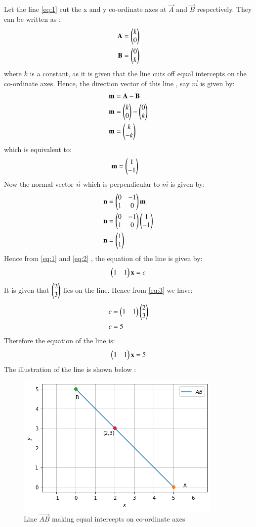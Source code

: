 \documentclass[journal,12pt,twocolumn]{IEEEtran}
\begin{document}
Let the line \eqref{eq:1} cut the x and y co-ordinate axes at $\vec{A}$ and $\vec{B}$ respectively. They can be written as :
\begin{align}
\mathbf{A} &= \begin{pmatrix}k \\ 0\end{pmatrix}\\
\mathbf{B} &= \begin{pmatrix}0 \\ k\end{pmatrix}
\end{align}
where $k$ is a constant, as it is given that the line cuts off equal intercepts on the co-ordinate axes. Hence, the direction vector of this line , say $\vec{m}$ is given by:
\begin{align}
\mathbf{m} &= \mathbf{A} - \mathbf{B}\\
\mathbf{m} &= \begin{pmatrix}k \\ 0\end{pmatrix} - \begin{pmatrix}0 \\ k\end{pmatrix}\\
\mathbf{m} &= \begin{pmatrix}k \\ -k\end{pmatrix}
\end{align}
which is equivalent to:
\begin{align}
\mathbf{m} &= \begin{pmatrix}1 \\ -1\end{pmatrix}   
\end{align}
Now the normal vector $\vec{n}$ which is perpendicular to $\vec{m}$ is given by:
\begin{align}
\mathbf{n} &= \begin{pmatrix}0 & -1 \\ 1 & 0\end{pmatrix}\mathbf{m}\\
\mathbf{n} &= \begin{pmatrix}0 & -1 \\ 1 & 0\end{pmatrix}\begin{pmatrix}1 \\ -1\end{pmatrix}\\
\mathbf{n} &= \begin{pmatrix}1 \\ 1\end{pmatrix}\label{eq:2}
\end{align}
Hence from \eqref{eq:1} and \eqref{eq:2} , the equation of the line is given by:
\begin{align}
\begin{pmatrix}1 & 1\end{pmatrix}\mathbf{x}=c\label{eq:3}
\end{align}
It is given that $\begin{pmatrix}2 \\ 3\end{pmatrix}$ lies on the line. Hence from \eqref{eq:3} we have:
\begin{align}
c &=\begin{pmatrix}1 & 1\end{pmatrix}\begin{pmatrix}2 \\ 3\end{pmatrix}\\
c &= 5
\end{align}
Therefore the equation of the line is:
\begin{align}
\begin{pmatrix}1 & 1\end{pmatrix}\mathbf{x}=5
\end{align}
The illustration of the line is shown below :
\begin{figure}[!ht]
       \centering
    \includegraphics[width=\columnwidth] {Assignment_4_Fig_1.png}
    \caption{Line $\vec{AB}$ making equal intercepts on co-ordinate axes}
    \label{Line AB}
\end{figure}
\end{document}
